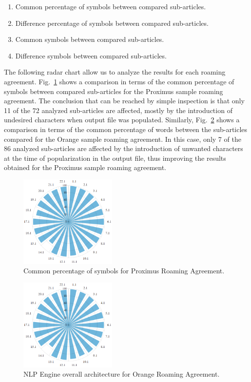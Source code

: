 \documentclass[conference]{style/IEEEtran}
\begin{document}
\begin{enumerate}
\item Common percentage of symbols between compared sub-articles.
\item Difference percentage of symbols between compared sub-articles.
\item Common symbols between compared sub-articles.
\item Difference symbols between compared sub-articles.
\end{enumerate}

The following radar chart allow us to analyze the results for each roaming agreement. Fig.~\ref{fig3} shows a comparison in terms of the common percentage of symbols between compared sub-articles for the Proximus sample roaming agreement. The conclusion that can be reached by simple inspection is that only 11 of the 72 analyzed sub-articles are affected, mostly by the introduction of undesired characters when output file was populated. Similarly, Fig.~\ref{fig4} shows a comparison in terms of the common percentage of words between the sub-articles compared for the Orange sample roaming agreement. In this case, only 7 of the 86 analyzed sub-articles are affected by the introduction of unwanted characters at the time of popularization in the output file, thus improving the results obtained for the Proximus sample roaming agreement.

\begin{figure}[htbp]
\centerline{\includegraphics[width=0.43\textwidth]{images/Proximus.png}}
\caption{Common percentage of symbols for Proximus Roaming Agreement.}
\label{fig3}
\end{figure}

\begin{figure}[htbp]
\centerline{\includegraphics[width=0.43\textwidth]{images/Orange.png}}
\caption{NLP Engine overall architecture for Orange Roaming Agreement.}
\label{fig4}
\end{figure}
\end{document}

